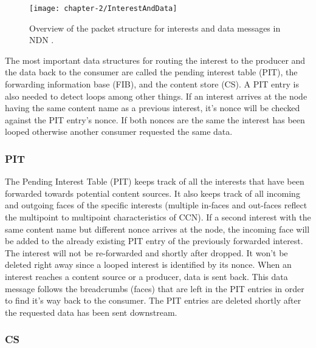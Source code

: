 \vspace{5mm} %

\begin{figure}[H]
  \centering
  \texttt{[image: chapter-2/InterestAndData]}
  \caption{Overview of the packet structure for interests and data messages in NDN \cite{ndnWiki}.}
  \label{fig:InterestAndData}
\end{figure}

\vspace{5mm} %

The most important data structures for routing the interest to the producer and the data back to the consumer are called the pending interest table (PIT), the forwarding information base (FIB), and the content store (CS). A PIT entry is also needed to detect loops among other things. If an interest arrives at the node having the same content name as a previous interest, it's nonce will be checked against the PIT entry's nonce. If both nonces are the same the interest has been looped otherwise another consumer requested the same data.

\subsubsection{PIT}

The Pending Interest Table (PIT) keeps track of all the interests that have been forwarded towards potential content sources. It also keeps track of all incoming and outgoing faces of the specific interests (multiple in-faces and out-faces reflect the multipoint to multipoint characteristics of CCN). If a second interest with the same content name but different nonce arrives at the node, the incoming face will be added to the already existing PIT entry of the previously forwarded interest. The interest will not be re-forwarded and shortly after dropped. It won't be deleted right away since a looped interest is identified by its nonce. When an interest reaches a content source or a producer, data is sent back.  This data message follows the breadcrumbs (faces) that are left in the PIT entries in order to find it's way back to the consumer. The PIT entries are deleted shortly after the requested data has been sent downstream.

\subsubsection{CS} 

